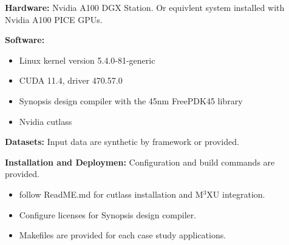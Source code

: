 \documentclass[conference]{IEEEtran}
\newcommand{\MPCMXU}[1]{M$^{3}$XU}
\begin{document}
\artin
\noindent\textbf{Hardware:} Nvidia A100 DGX Station. Or equivlent system installed with Nvidia A100 PICE GPUs.

\noindent\textbf{Software:}
\begin{itemize}
    \item Linux kernel version 5.4.0-81-generic
    \item CUDA 11.4, driver 470.57.0
    \item Synopsis design compiler with the 45nm FreePDK45 library
    \item Nvidia cutlass
\end{itemize}

\noindent\textbf{Datasets:} Input data are synthetic by framework or provided. 

\noindent\textbf{Installation and Deploymen:} Configuration and build commands are provided.

\artcomp
\begin{itemize}
    \item follow ReadME.md for cutlass installation and \MPCMXU{} integration.
    \item Configure licenses for Synopsis design compiler.
    \item Makefiles are provided for each case study applications.
\end{itemize}
\artout










\end{document}
